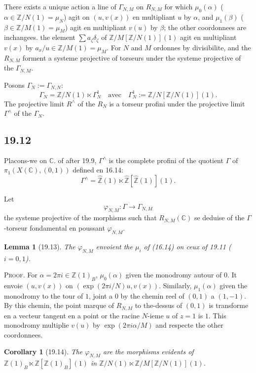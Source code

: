 \documentclass[12pt,a4paper]{article}
\theoremstyle{plain}
\newtheorem{lemma}[theorem]{Lemma}
\newtheorem{corollary}[theorem]{Corollary}
\theoremstyle{definition}
\theoremstyle{remark}
\newcommand{\Betti}{B}
\newcommand{\ZZ}{\mathbb{Z}}
\newcommand{\CC}{\mathbb{C}}
\begin{document}
There exists a unique action a line of $\Gamma_{N,M}$ on $R_{N,M}$
for which $\mu_0(\alpha)$ ($\alpha \in \ZZ/N(1) = \mu_N$) agit on
$(u,v(x))$ en multipliant $u$ by $\alpha$, and $\mu_1(\beta)$
($\beta \in \ZZ/M(1) = \mu_M$) agit en multipliant $v(u)$ by
$\beta$; the other coordonnees are inchangees. the element
$\sum a_\zeta \delta_\zeta$ of $\ZZ/M[\ZZ/N(1)](1)$ agit en
multipliant $v(x)$ by $a_x/u \in \ZZ/M(1) = \mu_M$. For $N$ and $M$
ordonnes by divisibilite, and the $R_{N,M}$ forment a systeme
projective of torseurs under the systeme projective of the $\Gamma_{N,M}$.

Posons $\Gamma_N := \Gamma_{N,N}$:
\[
\Gamma_N = \ZZ/N(1) \ltimes \Gamma_N^1 \quad \text{avec} \quad
\Gamma_N^1 := \ZZ/N[\ZZ/N(1)](1).
\]
The projective limit $R^\wedge$ of the $R_N$ is a torseur profini under
the projective limit $\Gamma^\wedge$ of the $\Gamma_N$.

\subsection{19.12}

Placons-we on $\CC$. of after 19.9, $\Gamma^\wedge$ is the complete
profini of the quotient $\Gamma$ of $\pi_1(X(\CC),(0,1))$ defined en 16.14:
\[
\Gamma^\wedge = \hat{\ZZ}(1) \ltimes \hat{\ZZ}[\hat{\ZZ}(1)](1).
\]

Let
\begin{equation}\label{eq:19.12.1}
\varphi_{N,M} : \Gamma \to \Gamma_{N,M}
\end{equation}
the systeme projective of the morphisms such that $R_{N,M}(\CC)$ se
deduise of the $\Gamma$-torseur fondamental en poussant $\varphi_{N,M}$.

\begin{lemma}[19.13]\label{lem:19.13}
The $\varphi_{N,M}$ envoient the $\mu_i$ of (16.14) on ceux of 19.11
($i=0,1$).
\end{lemma}

\noindent \textsc{Proof.} For $\alpha = 2\pi i \in \ZZ(1)_\Betti$,
$\mu_0(\alpha)$ given the monodromy autour of $0$. It envoie
$(u,v(x))$ on $(\exp(2\pi i/N)u, v(x))$. Similarly, $\mu_1(\alpha)$
given the monodromy to the tour of $1$, joint a $0$ by the chemin reel of
$(0,1)$ a $(1,-1)$. By this chemin, the point marque of $R_{N,M}$
to the-dessus of $(0,1)$ is transforme en a vecteur tangent en a point
or the racine $N$-ieme $u$ of $z=1$ is $1$. This monodromy
multiplie $v(u)$ by $\exp(2\pi i\alpha/M)$ and respecte the other
coordonnees.

\begin{corollary}[19.14]\label{cor:19.14}
The $\varphi_{N,M}$ are the morphisms evidents of
$\ZZ(1)_\Betti \ltimes \ZZ[\ZZ(1)_\Betti](1)$ in
$\ZZ/N(1) \ltimes \ZZ/M[\ZZ/N(1)](1)$.
\end{corollary}
\end{document}
